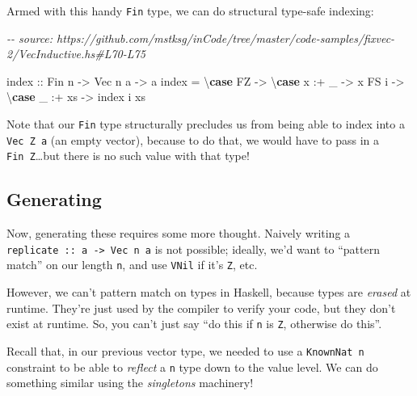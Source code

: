 \documentclass[]{article}
\newenvironment{Shaded}{}{}
\newcommand{\CommentTok}[1]{\textcolor[rgb]{0.38,0.63,0.69}{\textit{#1}}}
\newcommand{\DataTypeTok}[1]{\textcolor[rgb]{0.56,0.13,0.00}{#1}}
\newcommand{\FunctionTok}[1]{\textcolor[rgb]{0.02,0.16,0.49}{#1}}
\newcommand{\KeywordTok}[1]{\textcolor[rgb]{0.00,0.44,0.13}{\textbf{#1}}}
\newcommand{\NormalTok}[1]{#1}
\newcommand{\OperatorTok}[1]{\textcolor[rgb]{0.40,0.40,0.40}{#1}}
\newcommand{\OtherTok}[1]{\textcolor[rgb]{0.00,0.44,0.13}{#1}}
\begin{document}
Armed with this handy \texttt{Fin} type, we can do structural type-safe
indexing:

\begin{Shaded}
\begin{Highlighting}[]
\CommentTok{{-}{-} source: https://github.com/mstksg/inCode/tree/master/code{-}samples/fixvec{-}2/VecInductive.hs\#L70{-}L75}

\FunctionTok{index}\OtherTok{ ::} \DataTypeTok{Fin}\NormalTok{ n }\OtherTok{{-}\textgreater{}} \DataTypeTok{Vec}\NormalTok{ n a }\OtherTok{{-}\textgreater{}}\NormalTok{ a}
\FunctionTok{index} \OtherTok{=}\NormalTok{ \textbackslash{}}\KeywordTok{case}
    \DataTypeTok{FZ} \OtherTok{{-}\textgreater{}}\NormalTok{ \textbackslash{}}\KeywordTok{case}
\NormalTok{      x }\OperatorTok{:+}\NormalTok{ \_ }\OtherTok{{-}\textgreater{}}\NormalTok{ x}
    \DataTypeTok{FS}\NormalTok{ i }\OtherTok{{-}\textgreater{}}\NormalTok{ \textbackslash{}}\KeywordTok{case}
\NormalTok{      \_ }\OperatorTok{:+}\NormalTok{ xs }\OtherTok{{-}\textgreater{}} \FunctionTok{index}\NormalTok{ i xs}
\end{Highlighting}
\end{Shaded}

Note that our \texttt{Fin} type structurally precludes us from being able to
index into a \texttt{Vec\ \textquotesingle{}Z\ a} (an empty vector), because to
do that, we would have to pass in a \texttt{Fin\ \textquotesingle{}Z}\ldots but
there is no such value with that type!

\subsection{Generating}\label{generating-1}

Now, generating these requires some more thought. Naively writing a
\texttt{replicate\ ::\ a\ -\textgreater{}\ Vec\ n\ a} is not possible; ideally,
we'd want to ``pattern match'' on our length \texttt{n}, and use \texttt{VNil}
if it's \texttt{\textquotesingle{}Z}, etc.

However, we can't pattern match on types in Haskell, because types are
\emph{erased} at runtime. They're just used by the compiler to verify your code,
but they don't exist at runtime. So, you can't just say ``do this if \texttt{n}
is \texttt{\textquotesingle{}Z}, otherwise do this''.

Recall that, in our previous vector type, we needed to use a
\texttt{KnownNat\ n} constraint to be able to \emph{reflect} a \texttt{n} type
down to the value level. We can do something similar using the \emph{singletons}
machinery!
\end{document}
